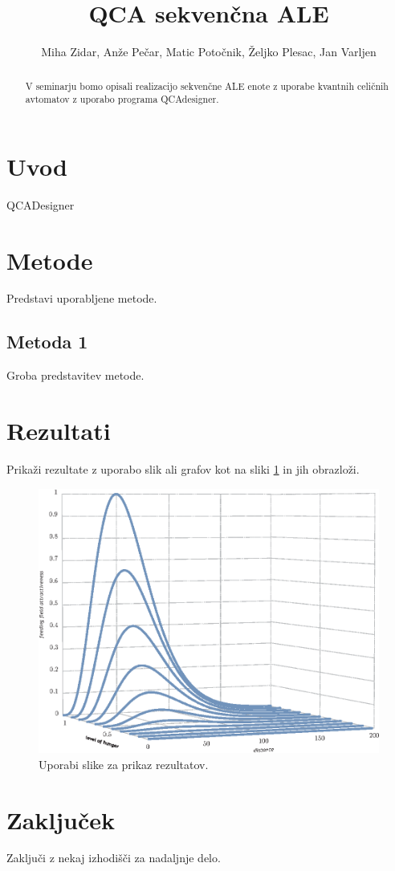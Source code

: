 \documentclass[seminar, slovene]{FRIreport}
\newcommand{\figref}[1]{\ref{#1}}
\begin{document}
\title{QCA sekven\v cna ALE}

\author{Miha Zidar, Anže Pečar, Matic Potočnik, Željko Plesac, Jan Varljen}


\begin{abstract}
V seminarju bomo opisali realizacijo sekvenčne ALE enote z uporabe kvantnih celičnih avtomatov z uporabo programa QCAdesigner.

\end{abstract}

%
\section{Uvod}
%
QCADesigner \cite{walus:2004}

%
\section{Metode}
%
Predstavi uporabljene metode.

%
\subsection{Metoda 1}
%
Groba predstavitev metode.
 
%
\section{Rezultati}
Prikaži rezultate z uporabo slik ali grafov kot na sliki \figref{fig.Df} in jih obrazloži.
%
\begin{figure}[htb]
\includegraphics{figDf.eps}
\caption{Uporabi slike za prikaz rezultatov.}
\label{fig.Df}
\end{figure}
%

%
\section{Zaključek}
Zaključi z nekaj izhodišči za nadaljnje delo.

%
\References
%

%

\end{document}
